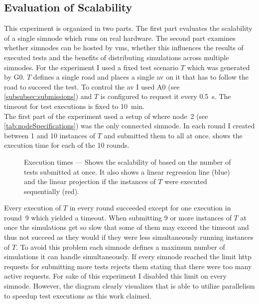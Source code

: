 \subsection{Evaluation of Scalability}\label{subsec:evaluationOfScalability}
This experiment is organized in two parts.
The first part evaluates the scalability of a single \gls{simnode} which runs on real hardware.
The second part examines whether \glspl{simnode} can be hosted by \glspl{vm}, whether this influences the results of executed tests and the benefits of distributing simulations across multiple \glspl{simnode}.
For the experiment I used a fixed test scenario \(T\) which was generated by G0.
\(T\) defines a single road and places a single \gls{av} on it that has to follow the road to succeed the test.
To control the \gls{av} I used A0 (see \cref{subsubsec:submissions}) and \(T\) is configured to request it every \SI{0.5}{\second}.
The timeout for test executions is fixed to \SI{10}{\minute}.\\
The first part of the experiment used a setup of \drivebuild{} where node~2 (see \cref{tab:nodeSpecifications}) was the only connected \gls{simnode}.
In each round I created between \num{1} and \num{10} instances of \(T\) and submitted them to \drivebuild{} all at once.
 shows the execution time for each of the \num{10} rounds.
\begin{figure}
    
    \medskip
    \caption{%
        Execution times --- Shows the scalability of \drivebuild{} based on the number of tests submitted at once.
        It also shows a linear regression line (blue) and the linear projection if the instances of \(T\) were executed sequentially (red).
    }\label{fig:scalabilityCompleteExecutionTimesLaptop}
\end{figure}
Every execution of \(T\) in every round succeeded except for one execution in round~9 which yielded a timeout.
When submitting \num{9} or more instances of \(T\) at once the simulations get so slow that some of them may exceed the timeout and thus not succeed as they would if they were less simultaneously running instances of \(T\).
To avoid this problem each \gls{simnode} defines a maximum number of simulations it can handle simultaneously.
If every \gls{simnode} reached the limit \gls{http} requests for submitting more tests \drivebuild{} rejects them stating that there were too many active requests.
For sake of this experiment I disabled this limit on every \gls{simnode}.
However, the diagram clearly visualizes that \drivebuild{} is able to utilize parallelism to speedup test executions as this work claimed.
